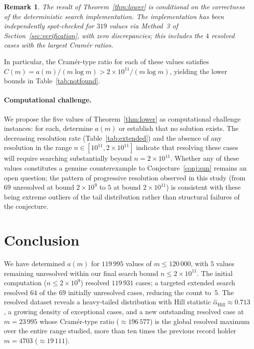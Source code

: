 \documentclass[pdflatex,sn-mathphys-num,Numbered]{sn-jnl}
\theoremstyle{thmstyleone}
\theoremstyle{thmstylethree}
\theoremstyle{thmstyletwo}
\newtheorem{remark}[theorem]{Remark}
\numberwithin{equation}{section}
\begin{document}
\begin{remark}
The result of Theorem~\textup{\ref{thm:lower}} is conditional on the
correctness of the deterministic search implementation.
The implementation has been independently spot-checked for $319$
values via Method~3 of Section~\textup{\ref{sec:verification}},
with zero discrepancies; this includes the $4$ resolved cases with
the largest Cram\'er ratios.
\end{remark}

In particular, the Cram\'er-type ratio for each of these values
satisfies $C(m) = a(m)/(m \log m) > 2 \times 10^{11}/(m \log m)$,
yielding the lower bounds in Table~\ref{tab:notfound}.

\paragraph{Computational challenge.}
We propose the five values of Theorem~\ref{thm:lower} as
computational challenge instances: for each, determine $a(m)$ or
establish that no solution exists.
The decreasing resolution rate (Table~\ref{tab:extended}) and the
absence of any resolution in the range
$n \in [10^{11}, 2 \times 10^{11}]$ indicate that resolving these
cases will require searching substantially beyond
$n = 2 \times 10^{11}$.
Whether any of these values constitutes a genuine counterexample to
Conjecture~\ref{conj:sun} remains an open question; the pattern of
progressive resolution observed in this study (from $69$ unresolved
at bound $2 \times 10^9$ to $5$ at bound $2 \times 10^{11}$) is
consistent with these being extreme outliers of the tail distribution
rather than structural failures of the conjecture.

\section{Conclusion}
\label{sec:conclusion}

We have determined $a(m)$ for $119\,995$ values of $m \leq 120\,000$,
with $5$ values remaining unresolved within our final search bound
$n \leq 2 \times 10^{11}$.
The initial computation ($n \leq 2 \times 10^9$) resolved $119\,931$
cases; a targeted extended search resolved $64$ of the
$69$ initially unresolved cases, reducing the count to~$5$.
The resolved dataset reveals a heavy-tailed distribution with Hill
statistic $\hat{\alpha}_{\mathrm{Hill}} \approx 0.713$, a growing
density of exceptional cases, and a new outstanding resolved case at
$m = 23\,995$ whose Cram\'er-type ratio ($\approx 196\,577$) is
the global resolved maximum over the entire range studied, more than
ten times the previous record holder $m = 4703$ ($\approx 19\,111$).
\end{document}
